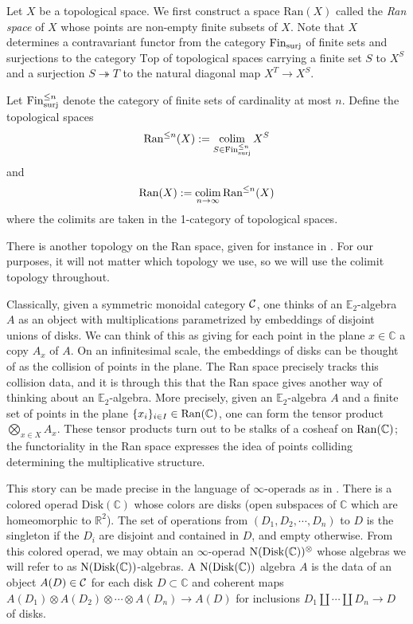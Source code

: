 Let $X$ be a topological space.  We first construct a space $\mathrm{Ran}(X)$ called the \emph{Ran space} of $X$ whose points are non-empty finite subsets of $X$.  Note that $X$ determines a contravariant functor from the category $\operatorname{\mathrm{Fin}}_{\text{surj}}$ of finite sets and surjections to the category $\mathrm{Top}$ of topological spaces carrying a finite set $S$ to $X^S$ and a surjection $S \twoheadrightarrow T$ to the natural diagonal map $X^T \to X^S.$

\begin{dfn}
Let $\operatorname{\mathrm{Fin}}^{\leq n}_{\mathrm{surj}}$ denote the category of finite sets of cardinality at most $n$.  Define the topological spaces $$\operatorname{\mathrm{Ran}}^{\leq n}(X) := \operatorname*{\mathrm{colim}}_{S\in \operatorname{\mathrm{Fin}}^{\leq n}_{\mathrm{surj}}} X^S$$ and $$\operatorname{\mathrm{Ran}}(X) := \operatorname*{\mathrm{colim}}_{n\to \infty} \operatorname{\mathrm{Ran}}^{\leq n}(X)$$ where the colimits are taken in the 1-category of topological spaces.  
\end{dfn}

\begin{rmk}
There is another topology on the Ran space, given for instance in \cite[\S 5.5]{HA}.  For our purposes, it will not matter which topology we use, so we will use the colimit topology throughout.  
\end{rmk}

Classically, given a symmetric monoidal category $\operatorname{\mathcal{C}}$, one thinks of an $\mathbb{E}_2$-algebra $A$ as an object with multiplications parametrized by embeddings of disjoint unions of disks.  We can think of this as giving for each point in the plane $x\in \mathbb{C}$ a copy $A_x$ of $A$.  On an infinitesimal scale, the embeddings of disks can be thought of as the collision of points in the plane.  The Ran space precisely tracks this collision data, and it is through this that the Ran space gives another way of thinking about an $\mathbb{E}_2$-algebra.  More precisely, given an $\mathbb{E}_2$-algebra $A$ and a finite set of points in the plane $\{x_i\}_{i\in I} \in \operatorname{\mathrm{Ran}}(\mathbb{C})$, one can form the tensor product $\bigotimes_{x\in X} A_x.$  These tensor products turn out to be stalks of a cosheaf on $\operatorname{\mathrm{Ran}}(\mathbb{C})$; the functoriality in the Ran space expresses the idea of points colliding determining the multiplicative structure.  

This story can be made precise in the language of $\infty$-operads as in \cite[\S 5.4.5]{HA}.  There is a colored operad $\mathrm{Disk}(\mathbb{C})$ whose colors are disks (open subspaces of $\mathbb{C}$ which are homeomorphic to $\mathbb{R}^2$).  The set of operations from $(D_1, D_2, \cdots, D_n)$ to $D$ is the singleton if the $D_i$ are disjoint and contained in $D$, and empty otherwise.  From this colored operad, we may obtain an $\infty$-operad $\operatorname{\mathrm{N}}(\mathrm{Disk}(\mathbb{C}))^{\otimes}$ whose algebras we will refer to as $\operatorname{\mathrm{N}}(\mathrm{Disk}(\mathbb{C}))$-algebras.  A $\operatorname{\mathrm{N}}(\mathrm{Disk}(\mathbb{C}))$ algebra $A$ is the data of an object $A(D)\in\operatorname{\mathcal{C}}$ for each disk $D\subset \mathbb{C}$ and coherent maps $A(D_1)\otimes A(D_2)\otimes \cdots \otimes A(D_n) \to A(D)$ for inclusions $D_1\coprod \cdots \coprod D_n \to D$ of disks.  %

